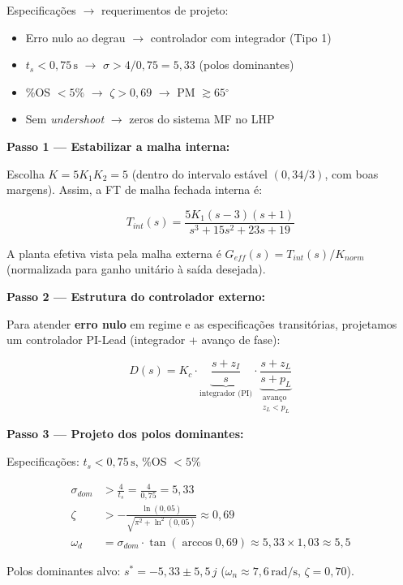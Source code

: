 \documentclass[12pt,a4paper]{article}
\newcommand{\degrees}{\ensuremath{^{\circ}}}
\begin{document}
\begin{metodo}
  Especificações $\to$ requerimentos de projeto:
  \begin{itemize}[nosep]
    \item Erro nulo ao degrau $\to$ controlador com integrador (Tipo 1)
    \item $t_s < 0{,}75\,\text{s}$ $\to$ $\sigma > 4/0{,}75 = 5{,}33$ (polos dominantes)
    \item \%OS $< 5\%$ $\to$ $\zeta > 0{,}69$ $\to$ PM $\gtrsim 65\degrees$
    \item Sem \textit{undershoot} $\to$ zeros do sistema MF no LHP
  \end{itemize}
\end{metodo}

\textbf{Passo 1 — Estabilizar a malha interna:}

Escolha $K = 5K_1 K_2 = 5$ (dentro do intervalo estável $(0, 34/3)$, com
boas margens). Assim, a FT de malha fechada interna é:

\[
  T_{int}(s) = \frac{5K_1(s-3)(s+1)}{s^3 + 15s^2 + 23s + 19}
\]

A planta efetiva vista pela malha externa é $G_{eff}(s) = T_{int}(s)/K_{norm}$
(normalizada para ganho unitário à saída desejada).

\textbf{Passo 2 — Estrutura do controlador externo:}

Para atender \textbf{erro nulo} em regime e as especificações transitórias,
projetamos um controlador PI-Lead (integrador + avanço de fase):

\[
  D(s) = K_c \cdot \underbrace{\frac{s + z_I}{s}}_{\text{integrador (PI)}}
         \cdot \underbrace{\frac{s + z_L}{s + p_L}}_{\substack{\text{avanço}\\ z_L < p_L}}
\]

\textbf{Passo 3 — Projeto dos polos dominantes:}

Especificações: $t_s < 0{,}75\,\text{s}$, \%OS $< 5\%$

\begin{align*}
  \sigma_{dom} &> \frac{4}{t_s} = \frac{4}{0{,}75} = 5{,}33 \\
  \zeta &> -\frac{\ln(0{,}05)}{\sqrt{\pi^2 + \ln^2(0{,}05)}} \approx 0{,}69 \\
  \omega_d &= \sigma_{dom} \cdot \tan(\arccos 0{,}69) \approx 5{,}33 \times 1{,}03 \approx 5{,}5
\end{align*}

Polos dominantes alvo: $s^* = -5{,}33 \pm 5{,}5\,j$ ($\omega_n \approx 7{,}6\,\text{rad/s}$,
$\zeta = 0{,}70$).
\end{document}
